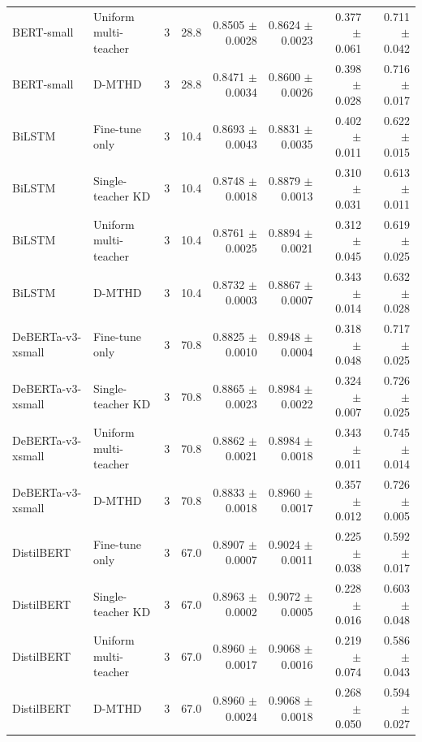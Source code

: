 \begin{table}[t]
\begin{tabular}{llrrrrrr}
BERT-small & Uniform multi-teacher & 3 & 28.8 & 0.8505 $\pm$ 0.0028 & 0.8624 $\pm$ 0.0023 & 0.377 $\pm$ 0.061 & 0.711 $\pm$ 0.042 \\
BERT-small & D-MTHD & 3 & 28.8 & 0.8471 $\pm$ 0.0034 & 0.8600 $\pm$ 0.0026 & 0.398 $\pm$ 0.028 & 0.716 $\pm$ 0.017 \\
BiLSTM & Fine-tune only & 3 & 10.4 & 0.8693 $\pm$ 0.0043 & 0.8831 $\pm$ 0.0035 & 0.402 $\pm$ 0.011 & 0.622 $\pm$ 0.015 \\
BiLSTM & Single-teacher KD & 3 & 10.4 & 0.8748 $\pm$ 0.0018 & 0.8879 $\pm$ 0.0013 & 0.310 $\pm$ 0.031 & 0.613 $\pm$ 0.011 \\
BiLSTM & Uniform multi-teacher & 3 & 10.4 & 0.8761 $\pm$ 0.0025 & 0.8894 $\pm$ 0.0021 & 0.312 $\pm$ 0.045 & 0.619 $\pm$ 0.025 \\
BiLSTM & D-MTHD & 3 & 10.4 & 0.8732 $\pm$ 0.0003 & 0.8867 $\pm$ 0.0007 & 0.343 $\pm$ 0.014 & 0.632 $\pm$ 0.028 \\
DeBERTa-v3-xsmall & Fine-tune only & 3 & 70.8 & 0.8825 $\pm$ 0.0010 & 0.8948 $\pm$ 0.0004 & 0.318 $\pm$ 0.048 & 0.717 $\pm$ 0.025 \\
DeBERTa-v3-xsmall & Single-teacher KD & 3 & 70.8 & 0.8865 $\pm$ 0.0023 & 0.8984 $\pm$ 0.0022 & 0.324 $\pm$ 0.007 & 0.726 $\pm$ 0.025 \\
DeBERTa-v3-xsmall & Uniform multi-teacher & 3 & 70.8 & 0.8862 $\pm$ 0.0021 & 0.8984 $\pm$ 0.0018 & 0.343 $\pm$ 0.011 & 0.745 $\pm$ 0.014 \\
DeBERTa-v3-xsmall & D-MTHD & 3 & 70.8 & 0.8833 $\pm$ 0.0018 & 0.8960 $\pm$ 0.0017 & 0.357 $\pm$ 0.012 & 0.726 $\pm$ 0.005 \\
DistilBERT & Fine-tune only & 3 & 67.0 & 0.8907 $\pm$ 0.0007 & 0.9024 $\pm$ 0.0011 & 0.225 $\pm$ 0.038 & 0.592 $\pm$ 0.017 \\
DistilBERT & Single-teacher KD & 3 & 67.0 & 0.8963 $\pm$ 0.0002 & 0.9072 $\pm$ 0.0005 & 0.228 $\pm$ 0.016 & 0.603 $\pm$ 0.048 \\
DistilBERT & Uniform multi-teacher & 3 & 67.0 & 0.8960 $\pm$ 0.0017 & 0.9068 $\pm$ 0.0016 & 0.219 $\pm$ 0.074 & 0.586 $\pm$ 0.043 \\
DistilBERT & D-MTHD & 3 & 67.0 & 0.8960 $\pm$ 0.0024 & 0.9068 $\pm$ 0.0018 & 0.268 $\pm$ 0.050 & 0.594 $\pm$ 0.027 \\
\bottomrule
\end{tabular}
\end{table}